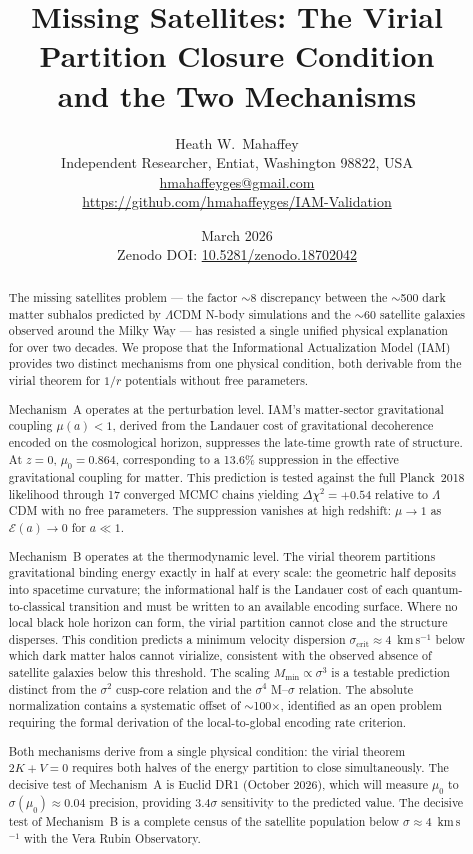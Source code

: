 \documentclass[12pt,a4paper]{article}
\title{\textbf{Missing Satellites: The Virial Partition Closure Condition\\
and the Two Mechanisms}}
\author{Heath W.\ Mahaffey\\
\small Independent Researcher, Entiat, Washington 98822, USA\\
\small \href{mailto:hmahaffeyges@gmail.com}{hmahaffeyges@gmail.com}\\
\small \url{https://github.com/hmahaffeyges/IAM-Validation}}
\date{March 2026\\
\small Zenodo DOI: \href{https://doi.org/10.5281/zenodo.18702042}{10.5281/zenodo.18702042}}
\begin{document}
\maketitle

\begin{abstract}
The missing satellites problem --- the factor $\sim$8 discrepancy between the
$\sim$500 dark matter subhalos predicted by $\Lambda$CDM N-body simulations
and the $\sim$60 satellite galaxies observed around the Milky Way --- has
resisted a single unified physical explanation for over two decades. We
propose that the Informational Actualization Model (IAM) provides two
distinct mechanisms from one physical condition, both derivable from the
virial theorem for $1/r$ potentials without free parameters.

Mechanism~A operates at the perturbation level. IAM's matter-sector
gravitational coupling $\mu(a) < 1$, derived from the Landauer cost of
gravitational decoherence encoded on the cosmological horizon, suppresses
the late-time growth rate of structure. At $z = 0$, $\mu_0 = 0.864$,
corresponding to a 13.6\% suppression in the effective gravitational
coupling for matter. This prediction is tested against the full Planck~2018
likelihood through 17 converged MCMC chains yielding $\Delta\chi^2 = +0.54$
relative to $\Lambda$CDM with no free parameters. The suppression vanishes
at high redshift: $\mu \to 1$ as $\mathcal{E}(a) \to 0$ for $a \ll 1$.

Mechanism~B operates at the thermodynamic level. The virial theorem partitions
gravitational binding energy exactly in half at every scale: the geometric half
deposits into spacetime curvature; the informational half is the Landauer cost
of each quantum-to-classical transition and must be written to an available
encoding surface. Where no local black hole horizon can form, the virial
partition cannot close and the structure disperses. This condition predicts a
minimum velocity dispersion $\sigma_\mathrm{crit} \approx 4$~km\,s$^{-1}$
below which dark matter halos cannot virialize, consistent with the observed
absence of satellite galaxies below this threshold. The scaling
$M_\mathrm{min} \propto \sigma^3$ is a testable prediction distinct from the
$\sigma^2$ cusp-core relation and the $\sigma^4$ M--$\sigma$ relation. The
absolute normalization contains a systematic offset of $\sim$100$\times$,
identified as an open problem requiring the formal derivation of the
local-to-global encoding rate criterion.

Both mechanisms derive from a single physical condition: the virial theorem
$2K + V = 0$ requires both halves of the energy partition to close
simultaneously. The decisive test of Mechanism~A is Euclid DR1 (October 2026),
which will measure $\mu_0$ to $\sigma(\mu_0) \approx 0.04$ precision,
providing $3.4\sigma$ sensitivity to the predicted value. The decisive test of
Mechanism~B is a complete census of the satellite population below
$\sigma \approx 4$~km\,s$^{-1}$ with the Vera Rubin Observatory.
\end{abstract}
\end{document}
